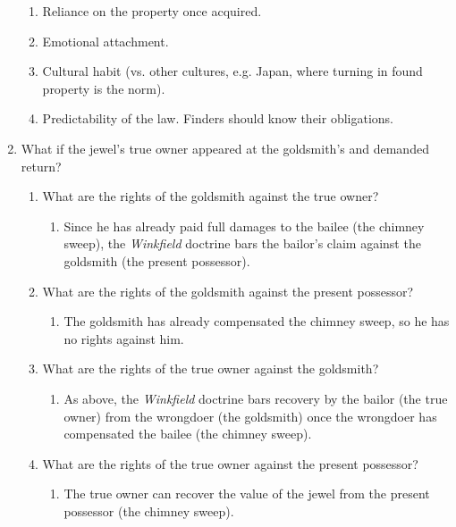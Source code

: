 \begin{enumerate}
\begin{enumerate}
        \item Reliance on the property once acquired.
        \item Emotional attachment.
        \item Cultural habit (vs. other cultures, e.g. Japan, where turning in 
        found property is the norm).
        \item Predictability of the law. Finders should know their 
        obligations.
    \end{enumerate}
    \item What if the jewel's true owner appeared at the goldsmith's and 
    demanded return?
    \begin{enumerate}
        \item What are the rights of the goldsmith against the true owner?
        \begin{enumerate}
            \item Since he has already paid full damages to the bailee (the 
            chimney sweep), the \emph{Winkfield} doctrine bars the bailor's 
            claim against the goldsmith (the present possessor).
        \end{enumerate}
        \item What are the rights of the goldsmith against the present 
        possessor?
        \begin{enumerate}
            \item The goldsmith has already compensated the chimney sweep, so 
            he has no rights against him.
        \end{enumerate}
        \item What are the rights of the true owner against the goldsmith?
        \begin{enumerate}
            \item As above, the \emph{Winkfield} doctrine bars recovery by the 
            bailor (the true owner) from the wrongdoer (the goldsmith) once 
            the wrongdoer has compensated the bailee (the chimney sweep).
        \end{enumerate}
        \item What are the rights of the true owner against the present 
        possessor?
        \begin{enumerate}
            \item The true owner can recover the value of the jewel from the 
            present possessor (the chimney sweep).
        \end{enumerate}
    \end{enumerate}

\end{enumerate}
